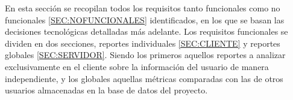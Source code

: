 
En esta sección se recopilan todos los requisitos tanto funcionales como no funcionales \ref{SEC:NOFUNCIONALES} identificados, en los que se basan las decisiones tecnológicas detalladas más adelante. Los requisitos funcionales se dividen en dos secciones, reportes individuales \ref{SEC:CLIENTE} y reportes globales \ref{SEC:SERVIDOR}. Siendo los primeros aquellos reportes a analizar exclusivamente en el cliente sobre la información del usuario de manera independiente, y los globales aquellas métricas comparadas con las de otros usuarios almacenadas en la base de datos del proyecto. 

